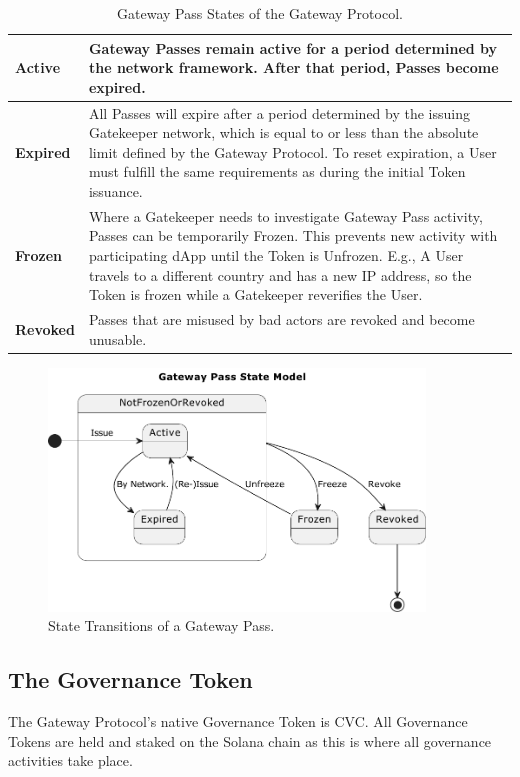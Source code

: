 \begin{table}[h]
\begin{tabular}{|m{}|m{}|}
\hline
\textbf{Active} & Gateway Passes remain active for a period determined by the network framework. After that period, Passes become expired.\\
\hline
\textbf{Expired} & All Passes will expire after a period determined by the issuing Gatekeeper network, which is equal to or less than the absolute limit defined by the Gateway Protocol. To reset expiration, a User must fulfill the same requirements as during the initial Token issuance.\\
\hline
\textbf{Frozen} & Where a Gatekeeper needs to investigate Gateway Pass activity, Passes can be temporarily Frozen. This prevents new activity with participating dApp until the Token is Unfrozen. E.g., A User travels to a different country and has a new IP address, so the Token is frozen while a Gatekeeper reverifies the User.\\
\hline
\textbf{Revoked} & Passes that are misused by bad actors are revoked and become unusable.\\
\hline
\end{tabular}
\caption{\label{tbl:gt-states}Gateway Pass States of the Gateway Protocol.}
\end{table}

\begin{figure}[h]
  \begin{center}
    \centering
    \includegraphics[width=100mm,scale=0.5]{figures/03-pass-state-diagram.pdf}
    \caption[Fig 2]{State Transitions of a Gateway Pass.}
  \end{center}
\end{figure}

\subsection{The Governance Token}
The Gateway Protocol’s native Governance Token is CVC. All Governance Tokens are held and staked on the Solana chain as this is where all governance activities take place.

